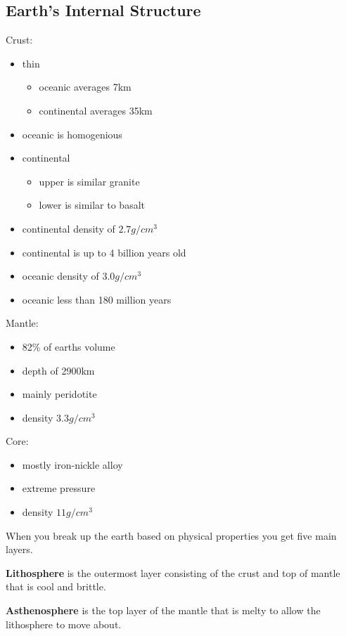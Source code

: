 \documentclass{article}
\begin{document}
\subsection{Earth's Internal Structure} %
\label{sub:earth_s_internal_structure}
Crust:
\begin{itemize}
    \item thin
    \begin{itemize}
         \item oceanic averages 7km
         \item continental averages 35km
     \end{itemize}
     \item oceanic is homogenious
     \item continental
     \begin{itemize}
         \item upper is similar granite
         \item lower is similar to basalt
     \end{itemize}
     \item continental density of $2.7 g/cm^3$
     \item continental is up to 4 billion years old
     \item oceanic density of $3.0 g/cm^3$
     \item oceanic less than 180 million years
\end{itemize}

Mantle:
\begin{itemize}
    \item 82\% of earths volume
    \item depth of 2900km
    \item mainly peridotite
    \item density $3.3g/cm^3$
\end{itemize}

Core:
\begin{itemize}
    \item mostly iron-nickle alloy
    \item extreme pressure
    \item density $11g/cm^3$
\end{itemize}

When you break up the earth based on physical properties you get five main layers.

\textbf{Lithosphere} is the outermost layer consisting of the crust and top of mantle that is cool and brittle.

\textbf{Asthenosphere} is the top layer of the mantle that is melty to allow the lithosphere to move about.
\end{document}

